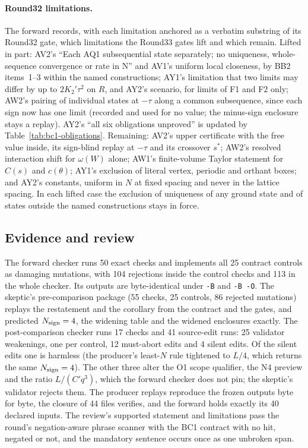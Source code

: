\paragraph{Round32 limitations.} The forward records, with each limitation
anchored as a verbatim substring of its Round32 gate, which limitations the
Round33 gates lift and which remain. Lifted in part: AV2's ``Each AQ1
subsequential state separately; no uniqueness, whole-sequence convergence or
rate in N'' and AV1's uniform local closeness, by BB2 items~1--3 within the
named constructions; AY1's limitation that two limits may differ by up to
$2K_2'\tau^2$ on $R$, and AY2's scenario, for limits of F1 and F2 only; AW2's
pairing of
individual states at $-\tau$ along a common subsequence, since each sign now
has one limit (recorded and used for no value; the minus-sign enclosure
stays a replay). AY2's ``all six obligations unproved'' is updated by
Table~\ref{tab:bc1-obligations}. Remaining: AV2's upper certificate with the
free value inside, its sign-blind replay at $-\tau$ and its crossover $s^*$;
AW2's resolved interaction shift for $\omega(W)$ alone; AW1's finite-volume
Taylor statement for $C(s)$ and $c(\theta)$; AY1's exclusion of literal vertex,
periodic and orthant boxes; and AY2's constants, uniform in $N$ at fixed
spacing and never in the lattice spacing. In each lifted case the exclusion
of uniqueness of any ground state and of states outside the named
constructions stays in force.

\subsection{Evidence and review}
\label{sec:bc1-evidence}
The forward checker runs 50 exact checks and implements all 25 contract
controls as damaging mutations, with 104 rejections inside the control checks
and 113 in the whole checker. Its outputs are byte-identical under
\texttt{-B} and \texttt{-B -O}. The skeptic's pre-comparison package (55
checks, 25 controls, 86 rejected mutations) replays the restatement and the
corollary from the contract and the gates, and predicted $N_{\rm sign}=4$,
the widening table and the widened enclosures exactly. The post-comparison
checker runs 17 checks and 41 source-edit runs: 25 validator weakenings, one
per control, 12 must-abort edits and 4 silent edits. Of the silent edits one
is harmless (the producer's least-$N$ rule tightened to $L/4$, which returns
the same $N_{\rm sign}=4$). The other three alter the O1 scope qualifier, the
N4 preview and the ratio $L/(C'q^3)$, which the forward checker does not pin;
the skeptic's validator rejects them. The producer replays reproduce the
frozen outputs byte for byte, the closure of 44 files verifies, and the
forward holds exactly its 40 declared inputs. The review's supported
statement and limitations pass the round's negation-aware phrase scanner with
the BC1 contract with no hit, negated or not, and the mandatory sentence
occurs once as one unbroken span.

